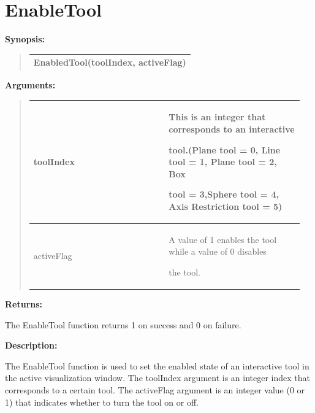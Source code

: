 \documentclass[letterpaper,10pt,english]{sphinxmanual}
\begin{document}
\section{EnableTool}
\label{functions:enabletool}
\begin{DUlineblock}{0em}
\item[] \textbf{Synopsis:}
\end{DUlineblock}
\begin{quote}

\begin{tabulary}{\linewidth}{|L|}
\hline

EnabledTool(toolIndex, activeFlag)
\\
\hline\end{tabulary}

\end{quote}

\begin{DUlineblock}{0em}
\item[] 
\item[] \textbf{Arguments:}
\end{DUlineblock}
\begin{quote}

\begin{tabular}{|p{0.475\linewidth}|p{0.475\linewidth}|}
\hline

toolIndex
 & 
\begin{DUlineblock}{0em}
\item[] This is an integer that corresponds to an interactive
\item[] tool.(Plane tool = 0, Line tool = 1, Plane tool = 2, Box
\item[] tool = 3,Sphere tool = 4, Axis Restriction tool = 5)
\end{DUlineblock}
\\
\hline
activeFlag
 & 
\begin{DUlineblock}{0em}
\item[] A value of 1 enables the tool while a value of 0 disables
\item[] the tool.
\end{DUlineblock}
\\
\hline\end{tabular}

\end{quote}

\begin{DUlineblock}{0em}
\item[] 
\item[] \textbf{Returns:}
\item[] The EnableTool function returns 1 on success and 0 on failure.
\item[] 
\item[] \textbf{Description:}
\item[] The EnableTool function is used to set the enabled state of an interactive
tool in the active visualization window. The toolIndex argument is an
integer index that corresponds to a certain tool. The activeFlag argument
is an integer value (0 or 1) that indicates whether to turn the tool on or
off.
\end{DUlineblock}
\end{document}
